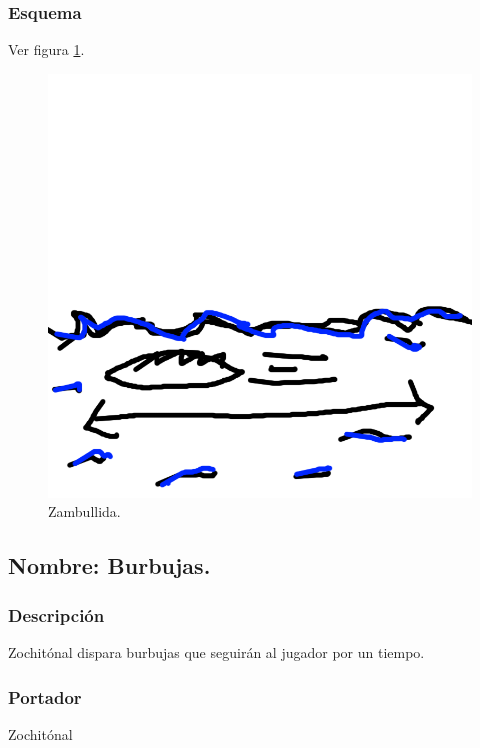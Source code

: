 \documentclass[11pt,letterpaper]{article}
\begin{document}
\subsubsection{Esquema}
			Ver figura \ref{fig:zambullida}.
			\begin{figure}
				\centering
				\includegraphics[height=0.2 \textheight]{Imagenes/zambullida}
				\caption{Zambullida.}
				\label{fig:zambullida}
			\end{figure}
\subsection{Nombre: Burbujas.}
\subsubsection{Descripción}
Zochitónal dispara burbujas que seguirán al jugador por un tiempo.  
\subsubsection{Portador}
Zochitónal
\end{document}
